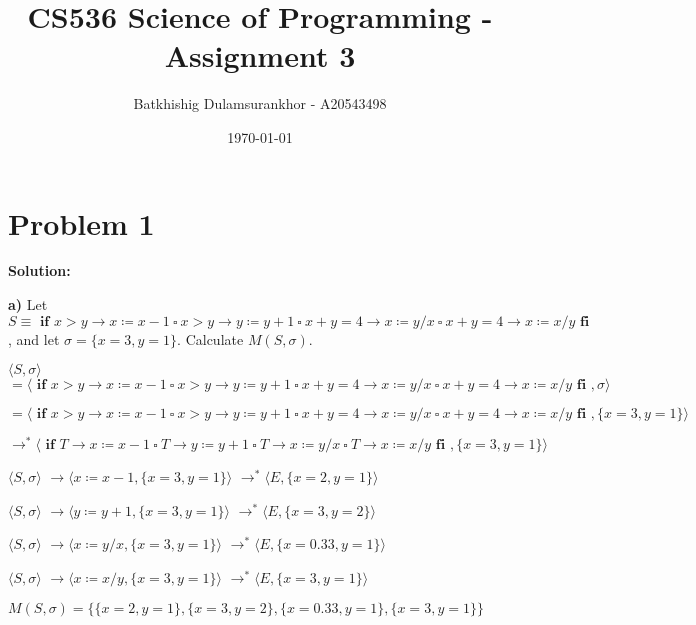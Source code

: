 \documentclass{article}
\title{CS536 Science of Programming - Assignment 3}
\author{Batkhishig Dulamsurankhor - A20543498}
\date{\today} %
\begin{document}
\maketitle


\section*{Problem 1}
\textbf{Solution:}


\textbf{a)} Let $ S \equiv \textbf{ if } x>y \rightarrow x \coloneqq x-1 \ \square \ x>y \rightarrow y \coloneqq y+1 \ \square \ x+y=4 \rightarrow x \coloneqq y/x \ \square \ x+y=4 \rightarrow x \coloneqq x/y \textbf{ fi }$, and let $ \sigma = \{ x=3, y=1\} $. Calculate  $ M(S,\sigma) $.

\vspace{10pt}
\qquad $\langle S, \sigma \rangle $ \quad $= \langle \textbf{ if } x>y \rightarrow x \coloneqq x-1 \ \square \ x>y \rightarrow y \coloneqq y+1 \ \square \ x+y=4 \rightarrow x \coloneqq y/x \ \square \ x+y=4 \rightarrow x \coloneqq x/y \textbf{ fi }, \sigma \rangle $

\qquad \qquad \qquad $= \langle \textbf{ if } x>y \rightarrow x \coloneqq x-1 \ \square \ x>y \rightarrow y \coloneqq y+1 \ \square \ x+y=4 \rightarrow x \coloneqq y/x \ \square \ x+y=4 \rightarrow x \coloneqq x/y \textbf{ fi }, \{ x=3, y=1\} \rangle $

\qquad \qquad \qquad $\rightarrow^* \langle \textbf{ if } T \rightarrow x \coloneqq x-1 \ \square \ T \rightarrow y \coloneqq y+1 \ \square \ T \rightarrow x \coloneqq y/x \ \square \ T \rightarrow x \coloneqq x/y \textbf{ fi }, \{ x=3, y=1\} \rangle $

\qquad $\langle S, \sigma \rangle $ \quad $\rightarrow \langle x \coloneqq x-1, \{x=3,y=1\} \rangle$ $\rightarrow^* \langle E, \{x=2,y=1\} \rangle$

\qquad $\langle S, \sigma \rangle $ \quad $\rightarrow \langle y \coloneqq y+1, \{x=3,y=1\} \rangle$ $\rightarrow ^*\langle E, \{x=3,y=2\} \rangle$

\qquad $\langle S, \sigma \rangle $ \quad $\rightarrow \langle x \coloneqq y/x, \{x=3,y=1\} \rangle$ $\rightarrow ^*\langle E, \{x=0.33,y=1\} \rangle$

\qquad $\langle S, \sigma \rangle $ \quad $\rightarrow \langle x \coloneqq x/y, \{x=3,y=1\} \rangle$ $\rightarrow ^*\langle E, \{x=3,y=1\} \rangle$

$M(S,\sigma)=\{\{x=2,y=1\},\{x=3,y=2\},\{x=0.33,y=1\},\{x=3,y=1\}\}$
\end{document}
